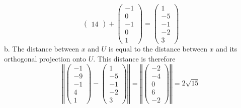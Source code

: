 \documentclass{article}
\newcommand{\chapternumber}{3}
\newenvironment{QandA}{\begin{enumerate}[label=\chapternumber.\arabic*]\bfseries\boldmath}
	{\end{enumerate}}
\newenvironment{answered}{\par\bigskip\normalfont\unboldmath}{}
\begin{document}
\begin{QandA}
\begin{answered}
\[\begin{pmatrix}
				14
			\end{pmatrix}
			+
			\begin{pmatrix}
				-1 \\
				0 \\
				-1 \\
				0 \\
				1
			\end{pmatrix}
			=
			\begin{pmatrix}
				1 \\ -5 \\ -1 \\ -2 \\ 3
			\end{pmatrix}
			\]
			b. The distance between $x$ and $U$ is equal to the distance between $x$ and its orthogonal projection onto $U$. This distance is therefore
			\[\left\Vert
			\begin{pmatrix}
				-1 \\
				-9 \\
				-1 \\
				4 \\
				1
			\end{pmatrix}
			-
			\begin{pmatrix}
				1 \\ -5 \\ -1 \\ -2 \\ 3
			\end{pmatrix}
			\right\Vert
			=
			\left\Vert
			\begin{pmatrix}
				-2 \\ -4 \\ 0 \\ 6 \\ -2
			\end{pmatrix}
			\right\Vert
			=
			2\sqrt{15}
			\]
		\end{answered}
	\end{QandA}
\end{document}

